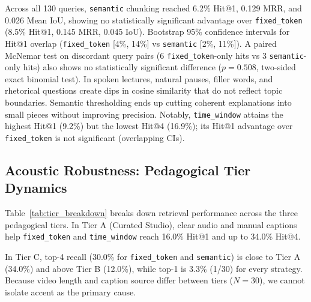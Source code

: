 \documentclass[conference]{IEEEtran}
\begin{document}
Across all 130 queries, \texttt{semantic} chunking reached 6.2\% Hit@1, 0.129 MRR, and 0.026 Mean IoU, showing no statistically significant advantage over \texttt{fixed\_token} (8.5\% Hit@1, 0.145 MRR, 0.045 IoU). Bootstrap 95\% confidence intervals for Hit@1 overlap (\texttt{fixed\_token} [4\%, 14\%] vs \texttt{semantic} [2\%, 11\%]). A paired McNemar test on discordant query pairs (6 \texttt{fixed\_token}-only hits vs 3 \texttt{semantic}-only hits) also shows no statistically significant difference ($p = 0.508$, two-sided exact binomial test). In spoken lectures, natural pauses, filler words, and rhetorical questions create dips in cosine similarity that do not reflect topic boundaries. Semantic thresholding ends up cutting coherent explanations into small pieces without improving precision. Notably, \texttt{time\_window} attains the highest Hit@1 (9.2\%) but the lowest Hit@4 (16.9\%); its Hit@1 advantage over \texttt{fixed\_token} is not significant (overlapping CIs).

\subsection{Acoustic Robustness: Pedagogical Tier Dynamics}
\label{sec:tier_dynamics}
Table~\ref{tab:tier_breakdown} breaks down retrieval performance across the three pedagogical tiers. In Tier A (Curated Studio), clear audio and manual captions help \texttt{fixed\_token} and \texttt{time\_window} reach 16.0\% Hit@1 and up to 34.0\% Hit@4. 

In Tier C, top-4 recall (30.0\% for \texttt{fixed\_token} and \texttt{semantic}) is close to Tier A (34.0\%) and above Tier B (12.0\%), while top-1 is 3.3\% (1/30) for every strategy. Because video length and caption source differ between tiers ($N=30$), we cannot isolate accent as the primary cause.
\end{document}
